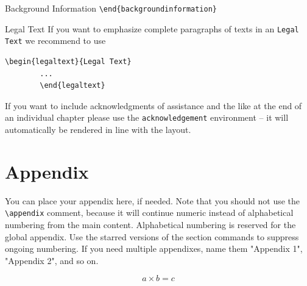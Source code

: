 \begin{bibunit}
\begin{backgroundinformation}{Background Information}
		\verb|\end{backgroundinformation}|
	\end{backgroundinformation}
	\begin{legaltext}{Legal Text}
		If you want to emphasize complete paragraphs of texts in an \verb|Legal Text| we recommend to
		use  \begin{verbatim}\begin{legaltext}{Legal Text}
		...
		\end{legaltext}\end{verbatim}
	\end{legaltext}
	\begin{acknowledgement}
		If you want to include acknowledgments of assistance and the like at the end of an individual chapter please use the \verb|acknowledgement| environment -- it will automatically be rendered in line with the layout.
	\end{acknowledgement}
	
	\section*{Appendix}\label{01:appendix}
	
	You can place your appendix here, if needed. Note that you should not use the \verb|\appendix| comment, because it will continue numeric instead of alphabetical numbering from the main content. Alphabetical numbering is reserved for the global appendix. Use the starred versions of the section commands to suppress ongoing numbering. If you need multiple appendixes, name them "Appendix 1", "Appendix 2", and so on.
	
	\begin{equation}
	a \times b = c
	\end{equation}
	
	
	
	

	
\end{bibunit}
	
%